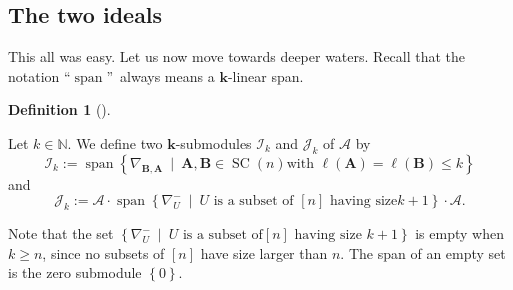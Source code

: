 \documentclass[numbers=enddot,12pt,final,onecolumn,notitlepage]{scrartcl}%
\numberwithin{exer}{subsection}
\theoremstyle{definition}
\newtheorem{defi}[theo]{Definition}
\newenvironment{definition}[1][]
{\begin{defi}[#1]\begin{leftbar}}
{\end{leftbar}\end{defi}}
\begin{document}
\subsection{The two ideals}

This all was easy. Let us now move towards deeper waters. Recall that the
notation \textquotedblleft$\operatorname*{span}$\textquotedblright\ always
means a $\mathbf{k}$-linear span.

\begin{definition}
\label{def.IJ}Let $k\in\mathbb{N}$. We define two $\mathbf{k}$-submodules
$\mathcal{I}_{k}$ and $\mathcal{J}_{k}$ of $\mathcal{A}$ by
\[
\mathcal{I}_{k}:=\operatorname*{span}\left\{  \nabla_{\mathbf{B},\mathbf{A}%
}\ \mid\ \mathbf{A},\mathbf{B}\in\operatorname*{SC}\left(  n\right)  \text{
with }\ell\left(  \mathbf{A}\right)  =\ell\left(  \mathbf{B}\right)  \leq
k\right\}
\]
and%
\[
\mathcal{J}_{k}:=\mathcal{A}\cdot\operatorname*{span}\left\{  \nabla_{U}%
^{-}\ \mid\ U\text{ is a subset of }\left[  n\right]  \text{ having size
}k+1\right\}  \cdot\mathcal{A}.
\]

\end{definition}

Note that the set $\left\{  \nabla_{U}^{-}\ \mid\ U\text{ is a subset of
}\left[  n\right]  \text{ having size }k+1\right\}  $ is empty when $k\geq n$,
since no subsets of $\left[  n\right]  $ have size larger than $n$. The span
of an empty set is the zero submodule $\left\{  0\right\}  $.
\end{document}
